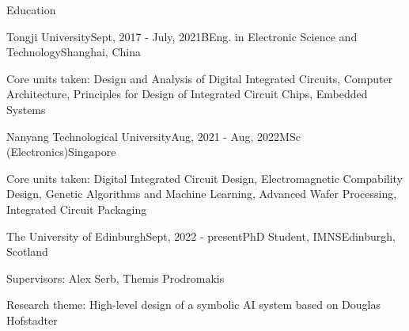 \documentclass{resume} %
\begin{document}

\begin{rSection}{Education}
	
	\begin{rSubsection}{Tongji University}{Sept, 2017 - July, 2021}{BEng. in Electronic Science and Technology}{Shanghai, China}
		\item Core units taken: Design and Analysis of Digital Integrated Circuits, Computer Architecture, Principles for Design of Integrated Circuit Chips, Embedded Systems
	\end{rSubsection}

	\begin{rSubsection}{Nanyang Technological University}{Aug, 2021 - Aug, 2022}{MSc (Electronics)}{Singapore}
		\item Core units taken: Digital Integrated Circuit Design, Electromagnetic Compability Design, Genetic Algorithms and Machine Learning, Advanced Wafer Processing, Integrated Circuit Packaging
	\end{rSubsection}

	\begin{rSubsection}{The University of Edinburgh}{Sept, 2022 - present}{PhD Student, IMNS}{Edinburgh, Scotland}
		\item Supervisors: Alex Serb, Themis Prodromakis
		\item Research theme: High-level design of a symbolic AI system based on Douglas Hofstadter
	\end{rSubsection}

\end{rSection}
\end{document}
